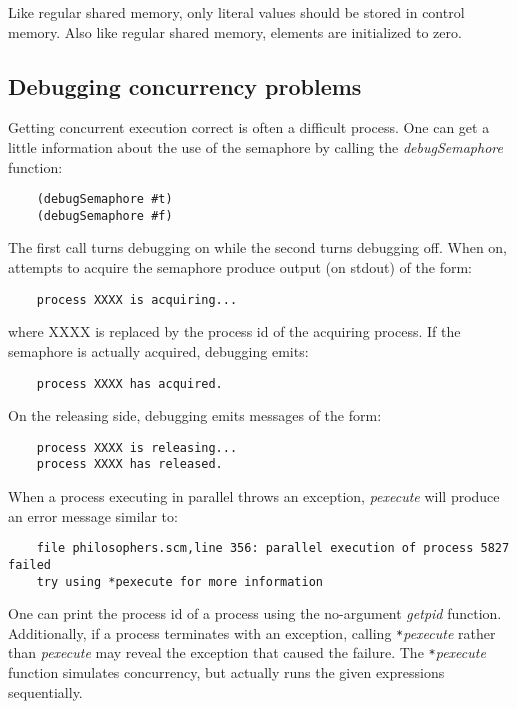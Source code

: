 Like regular shared memory, only literal values should be stored
in control memory. Also like regular shared memory, elements are initialized
to zero.

\subsection{Debugging concurrency problems}

Getting concurrent execution correct is often a difficult process.
One can get a little information about the use of the semaphore 
by calling the {\it debugSemaphore} function:

\begin{verbatim}
    (debugSemaphore #t)
    (debugSemaphore #f)
\end{verbatim}

The first call turns debugging on while the second turns debugging off. When
on, attempts to acquire the semaphore produce output (on stdout) of
the form:

\begin{verbatim}
    process XXXX is acquiring...
\end{verbatim}

where XXXX is replaced by the process id of the acquiring process.
If the semaphore is actually acquired, debugging emits:

\begin{verbatim}
    process XXXX has acquired.
\end{verbatim}

On the releasing side, debugging emits messages of the form:

\begin{verbatim}
    process XXXX is releasing...
    process XXXX has released.
\end{verbatim}

When a process executing in parallel throws an exception, {\it pexecute} will
produce an error message similar to:

\begin{verbatim}
    file philosophers.scm,line 356: parallel execution of process 5827 failed
    try using *pexecute for more information
\end{verbatim}

One can print the process id of a process
using the no-argument {\it getpid} function.
Additionally, if a process terminates with an exception,
calling \verb!*!{\it pexecute} rather than {\it pexecute} may reveal the
exception that caused the failure.
The \verb!*!{\it pexecute} function simulates concurrency, but actually runs the
given expressions sequentially.
